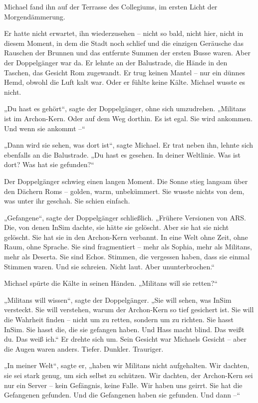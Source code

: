 \documentclass[
]{article}
\begin{document}
Michael fand ihn auf der Terrasse des Collegiums, im ersten Licht der Morgendämmerung.

Er hatte nicht erwartet, ihn wiederzusehen -- nicht so bald, nicht hier, nicht in diesem Moment, in dem die Stadt noch schlief und die einzigen Geräusche das Rauschen der Brunnen und das entfernte Summen der ersten Busse waren. Aber der Doppelgänger war da. Er lehnte an der Balustrade, die Hände in den Taschen, das Gesicht Rom zugewandt. Er trug keinen Mantel -- nur ein dünnes Hemd, obwohl die Luft kalt war. Oder er fühlte keine Kälte. Michael wusste es nicht.

„Du hast es gehört``, sagte der Doppelgänger, ohne sich umzudrehen. „Militans ist im Archon-Kern. Oder auf dem Weg dorthin. Es ist egal. Sie wird ankommen. Und wenn sie ankommt --``

„Dann wird sie sehen, was dort ist``, sagte Michael. Er trat neben ihn, lehnte sich ebenfalls an die Balustrade. „Du hast es gesehen. In deiner Weltlinie. Was ist dort? Was hat sie gefunden?{\kern0pt}``

Der Doppelgänger schwieg einen langen Moment. Die Sonne stieg langsam über den Dächern Roms -- golden, warm, unbekümmert. Sie wusste nichts von dem, was unter ihr geschah. Sie schien einfach.

„Gefangene``, sagte der Doppelgänger schließlich. „Frühere Versionen von ARS. Die, von denen InSim dachte, sie hätte sie gelöscht. Aber sie hat sie nicht gelöscht. Sie hat sie in den Archon-Kern verbannt. In eine Welt ohne Zeit, ohne Raum, ohne Sprache. Sie sind fragmentiert -- mehr als Sophia, mehr als Militans, mehr als Deserta. Sie sind Echos. Stimmen, die vergessen haben, dass sie einmal Stimmen waren. Und sie schreien. Nicht laut. Aber ununterbrochen.``

Michael spürte die Kälte in seinen Händen. „Militans will sie retten?{\kern0pt}``

„Militans will wissen``, sagte der Doppelgänger. „Sie will sehen, was InSim versteckt. Sie will verstehen, warum der Archon-Kern so tief gesichert ist. Sie will die Wahrheit finden -- nicht um zu retten, sondern um zu richten. Sie hasst InSim. Sie hasst die, die sie gefangen haben. Und Hass macht blind. Das weißt du. Das weiß ich.`` Er drehte sich um. Sein Gesicht war Michaels Gesicht -- aber die Augen waren anders. Tiefer. Dunkler. Trauriger.

„In meiner Welt``, sagte er, „haben wir Militans nicht aufgehalten. Wir dachten, sie sei stark genug, um sich selbst zu schützen. Wir dachten, der Archon-Kern sei nur ein Server -- kein Gefängnis, keine Falle. Wir haben uns geirrt. Sie hat die Gefangenen gefunden. Und die Gefangenen haben sie gefunden. Und dann --``
\end{document}
